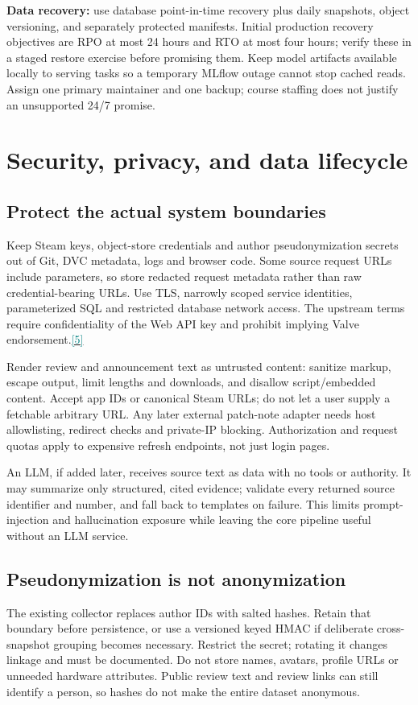 \documentclass[10pt,letterpaper]{article}
\newcommand{\sr}[1]{\hyperlink{src#1}{\textcolor{teal}{[#1]}}}
\newcommand{\key}[1]{\textbf{\color{ink}#1}}
\newcommand{\nextsection}[1]{\clearpage\section{#1}}
\begin{document}
\key{Data recovery:} use database point-in-time recovery plus daily snapshots, object versioning, and separately protected manifests. Initial production recovery objectives are RPO at most 24 hours and RTO at most four hours; verify these in a staged restore exercise before promising them. Keep model artifacts available locally to serving tasks so a temporary MLflow outage cannot stop cached reads. Assign one primary maintainer and one backup; course staffing does not justify an unsupported 24/7 promise.

\nextsection{Security, privacy, and data lifecycle}
\subsection{Protect the actual system boundaries}
Keep Steam keys, object-store credentials and author pseudonymization secrets out of Git, DVC metadata, logs and browser code. Some source request URLs include parameters, so store redacted request metadata rather than raw credential-bearing URLs. Use TLS, narrowly scoped service identities, parameterized SQL and restricted database network access. The upstream terms require confidentiality of the Web API key and prohibit implying Valve endorsement.\sr{5}

Render review and announcement text as untrusted content: sanitize markup, escape output, limit lengths and downloads, and disallow script/embedded content. Accept app IDs or canonical Steam URLs; do not let a user supply a fetchable arbitrary URL. Any later external patch-note adapter needs host allowlisting, redirect checks and private-IP blocking. Authorization and request quotas apply to expensive refresh endpoints, not just login pages.

An LLM, if added later, receives source text as data with no tools or authority. It may summarize only structured, cited evidence; validate every returned source identifier and number, and fall back to templates on failure. This limits prompt-injection and hallucination exposure while leaving the core pipeline useful without an LLM service.

\subsection{Pseudonymization is not anonymization}
The existing collector replaces author IDs with salted hashes. Retain that boundary before persistence, or use a versioned keyed HMAC if deliberate cross-snapshot grouping becomes necessary. Restrict the secret; rotating it changes linkage and must be documented. Do not store names, avatars, profile URLs or unneeded hardware attributes. Public review text and review links can still identify a person, so hashes do not make the entire dataset anonymous.
\end{document}
